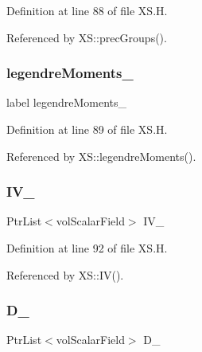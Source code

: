 Definition at line 88 of file X\+S.\+H.



Referenced by X\+S\+::prec\+Groups().

\mbox{\label{classFoam_1_1XS_a3ff89536c8e3ea70e46d35eccdfbfc4a}} 
\subsubsection{\texorpdfstring{legendre\+Moments\+\_\+}{legendreMoments\_}}
{\footnotesize\ttfamily label legendre\+Moments\+\_\+\hspace{0.3cm}{\ttfamily [protected]}}



Definition at line 89 of file X\+S.\+H.



Referenced by X\+S\+::legendre\+Moments().

\mbox{\label{classFoam_1_1XS_a931edd829a09bca4fb290036a3971f1d}} 
\subsubsection{\texorpdfstring{I\+V\+\_\+}{IV\_}}
{\footnotesize\ttfamily Ptr\+List$<$vol\+Scalar\+Field$>$ I\+V\+\_\+\hspace{0.3cm}{\ttfamily [protected]}}



Definition at line 92 of file X\+S.\+H.



Referenced by X\+S\+::\+I\+V().

\mbox{\label{classFoam_1_1XS_a96fec6b80cb2df43e7ea27107115e475}} 
\subsubsection{\texorpdfstring{D\+\_\+}{D\_}}
{\footnotesize\ttfamily Ptr\+List$<$vol\+Scalar\+Field$>$ D\+\_\+\hspace{0.3cm}{\ttfamily [protected]}}



